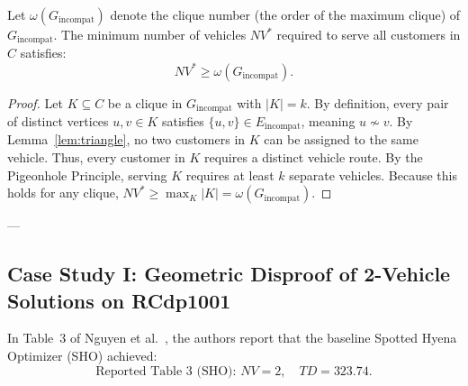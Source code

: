 \begin{theorem}
\label{thm:clique}
Let $\omega(G_{\text{incompat}})$ denote the clique number (the order of the maximum clique) of $G_{\text{incompat}}$. The minimum number of vehicles $NV^*$ required to serve all customers in $C$ satisfies:
\begin{equation}
NV^* \ge \omega(G_{\text{incompat}}).
\end{equation}
\end{theorem}
\begin{proof}
Let $K \subseteq C$ be a clique in $G_{\text{incompat}}$ with $|K| = k$. By definition, every pair of distinct vertices $u, v \in K$ satisfies $\{u, v\} \in E_{\text{incompat}}$, meaning $u \nsim v$. By Lemma~\ref{lem:triangle}, no two customers in $K$ can be assigned to the same vehicle. Thus, every customer in $K$ requires a distinct vehicle route. By the Pigeonhole Principle, serving $K$ requires at least $k$ separate vehicles. Because this holds for any clique, $NV^* \ge \max_{K} |K| = \omega(G_{\text{incompat}})$.
\end{proof}

---

\subsection{Case Study I: Geometric Disproof of 2-Vehicle Solutions on RCdp1001}
In Table~3 of Nguyen et al.~\cite{nguyen2026phshowoa}, the authors report that the baseline Spotted Hyena Optimizer (SHO) achieved:
\begin{equation}
\text{Reported Table 3 (SHO): } NV = 2, \quad TD = 323.74.
\end{equation}

